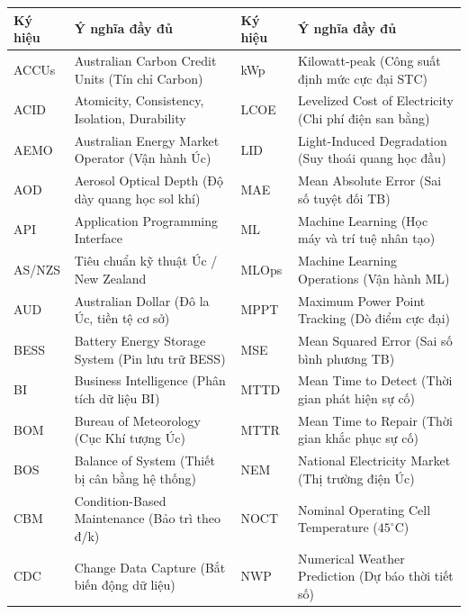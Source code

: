 \documentclass[12pt, a4paper]{report}
\begin{document}
\begin{table}[H]
\centering
\scriptsize
\renewcommand{\arraystretch}{1.12}
\begin{tabularx}{\textwidth}{@{} l >{\raggedright\arraybackslash}X @{\hspace{8pt}} l >{\raggedright\arraybackslash}X @{}}
\toprule
\textbf{Ký hiệu} & \textbf{Ý nghĩa đầy đủ} & \textbf{Ký hiệu} & \textbf{Ý nghĩa đầy đủ} \\
\midrule
ACCUs      & Australian Carbon Credit Units (Tín chỉ Carbon) & kWp       & Kilowatt-peak (Công suất định mức cực đại STC) \\
ACID       & Atomicity, Consistency, Isolation, Durability   & LCOE      & Levelized Cost of Electricity (Chi phí điện san bằng) \\
AEMO       & Australian Energy Market Operator (Vận hành Úc) & LID       & Light-Induced Degradation (Suy thoái quang học đầu) \\
AOD        & Aerosol Optical Depth (Độ dày quang học sol khí)& MAE       & Mean Absolute Error (Sai số tuyệt đối TB) \\
API        & Application Programming Interface               & ML        & Machine Learning (Học máy và trí tuệ nhân tạo) \\
AS/NZS     & Tiêu chuẩn kỹ thuật Úc / New Zealand            & MLOps     & Machine Learning Operations (Vận hành ML) \\
AUD        & Australian Dollar (Đô la Úc, tiền tệ cơ sở)     & MPPT      & Maximum Power Point Tracking (Dò điểm cực đại) \\
BESS       & Battery Energy Storage System (Pin lưu trữ BESS)& MSE       & Mean Squared Error (Sai số bình phương TB) \\
BI         & Business Intelligence (Phân tích dữ liệu BI)    & MTTD      & Mean Time to Detect (Thời gian phát hiện sự cố) \\
BOM        & Bureau of Meteorology (Cục Khí tượng Úc)        & MTTR      & Mean Time to Repair (Thời gian khắc phục sự cố) \\
BOS        & Balance of System (Thiết bị cân bằng hệ thống)  & NEM       & National Electricity Market (Thị trường điện Úc) \\
CBM        & Condition-Based Maintenance (Bảo trì theo đ/k)  & NOCT      & Nominal Operating Cell Temperature ($45^\circ\text{C}$) \\
CDC        & Change Data Capture (Bắt biến động dữ liệu)     & NWP       & Numerical Weather Prediction (Dự báo thời tiết số) \\

\end{tabularx}
\end{table}
\end{document}
